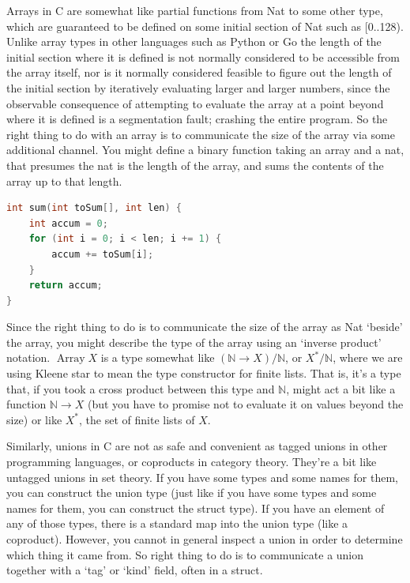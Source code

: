 \documentclass{proc-l}
\theoremstyle{definition}
\theoremstyle{remark}
\numberwithin{equation}{section}
\begin{document}
Arrays in C are somewhat like  partial functions from Nat to some other type,
which are guaranteed to be defined on some initial section of Nat such as [0..128).
Unlike array types in other languages such as Python or Go the length of the initial section where it is defined
is not normally considered to be accessible from the array itself,
nor is it normally considered feasible to figure out the length of the initial section by
iteratively evaluating larger and larger numbers, since the observable consequence of
attempting to evaluate the array at a point beyond where it is defined is a segmentation fault;
crashing the entire program. So the right thing to do with an array is to communicate the size of the array
via some additional channel. You might define a binary function taking an array and a nat,
that presumes the nat is the length of the array, and sums the contents of the array up to that length.

\begin{lstlisting}[language=C]
int sum(int toSum[], int len) {
    int accum = 0;
    for (int i = 0; i < len; i += 1) {
        accum += toSum[i];
    }
    return accum;
}
\end{lstlisting}

Since the right thing to do is to communicate the size of the array as Nat `beside' the array,
you might describe the type of the array using an `inverse product' notation.
\(\operatorname{Array} X\) is a type somewhat like \((\mathbb{N} \to X) / \mathbb{N}\), or \(X^* / \mathbb{N}\), where we are using Kleene star to mean the type constructor for finite lists. That is, it's a type that, if you took a cross product between this type and \(\mathbb{N}\),
might act a bit like a function \(\mathbb{N} \to X\) (but you have to promise not to evaluate it on values beyond the size) or like \(X^*\), the set of finite lists of \(X\).

Similarly, unions in C are not as safe and convenient as tagged unions in other programming languages,
or coproducts in category theory. They're a bit like untagged unions in set theory.
If you have some types and some names for them, you can construct the union type
(just like if you have some types and some names for them, you can construct the struct type).
If you have an element of any of those types, there is a standard map into the union type
(like a coproduct). However, you cannot in general inspect a union in order to determine which
thing it came from. So right thing to do is to communicate a union together with a `tag' or `kind' field, often in a struct.
\end{document}
